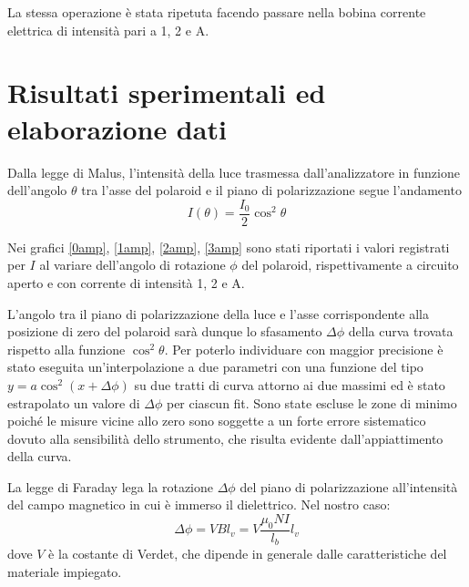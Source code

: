 \documentclass[italian,a4paper]{article}
\begin{document}
La stessa operazione è stata ripetuta facendo passare nella bobina corrente elettrica di intensità pari a 1, 2 e \unit[3]{A}.
\section{Risultati sperimentali ed elaborazione dati}
Dalla legge di Malus, l'intensità della luce trasmessa dall'analizzatore in funzione dell'angolo $\theta$ tra l'asse del polaroid e il piano di polarizzazione segue l'andamento
\begin{equation*}
I(\theta)=\dfrac{I_0}{2}\cos^2\theta 
\end{equation*}

Nei grafici \ref{0amp}, \ref{1amp}, \ref{2amp}, \ref{3amp} sono stati riportati i valori registrati per $I$ al variare dell'angolo di rotazione $\phi$ del polaroid, rispettivamente a circuito aperto e con corrente di intensità 1, 2 e \unit[3]{A}.

L'angolo tra il piano di polarizzazione della luce e l'asse corrispondente alla posizione di zero del polaroid sarà dunque lo sfasamento $\Delta\phi$ della curva trovata rispetto alla funzione $\cos^2\theta$. Per poterlo individuare con maggior precisione è stato eseguita un'interpolazione a due parametri con una funzione del tipo $y=a\cos^2(x+\Delta\phi)$ su due tratti di curva attorno ai due massimi ed è stato estrapolato un valore di $\Delta\phi$ per ciascun fit. Sono state escluse le zone di minimo poiché le misure vicine allo zero sono soggette a un forte errore sistematico dovuto alla sensibilità dello strumento, che risulta evidente dall'appiattimento della curva.

La legge di Faraday lega la rotazione $\Delta\phi$ del piano di polarizzazione all'intensità del campo magnetico in cui è immerso il dielettrico. Nel nostro caso:
\begin{equation*}
\Delta\phi=VBl_v=V\dfrac{\mu_0NI}{l_b}l_v
\end{equation*}
dove $V$ è la costante di Verdet, che dipende in generale dalle caratteristiche del materiale impiegato.
\end{document}
